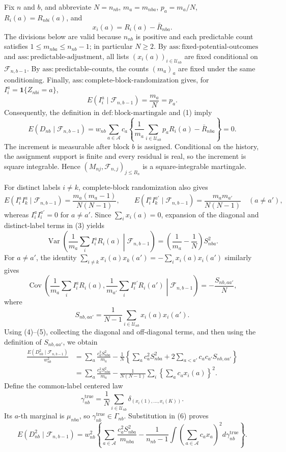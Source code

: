 Fix \(n\) and \(b\), and abbreviate \(N=n_{nb}\), \(m_a=m_{nba}\), \(p_a=m_a/N\), \(R_i(a)=R_{nbi}(a)\), and
\[
x_i(a)=R_i(a)-\bar R_{nba}.
\]
The divisions below are valid because \(n_{nb}\) is positive and each predictable count satisfies \(1\le m_{nba}\le n_{nb}-1\); in particular \(N\ge2\). By \(\mathrm{ass:fixed\text{-}potential\text{-}outcomes}\) and \(\mathrm{ass:predictable\text{-}adjustment}\), all lists \((x_i(a))_{i\in\mathcal U_{nb}}\) are fixed conditional on \(\mathcal F_{n,b-1}\). By \(\mathrm{ass:predictable\text{-}counts}\), the counts \((m_a)_a\) are fixed under the same conditioning. Finally, \(\mathrm{ass:complete\text{-}block\text{-}randomization}\) gives, for \(I_i^a=\mathbf 1\{Z_{nbi}=a\}\),
\[
E(I_i^a\mid\mathcal F_{n,b-1})=\frac{m_a}{N}=p_a.
\tag{1}
\]
Consequently, the definition in \(\mathrm{def:block\text{-}martingale}\) and (1) imply
\[
E(D_{nb}\mid\mathcal F_{n,b-1})
=w_{nb}\sum_{a\in\mathcal A}c_a
\left\{\frac1{m_a}\sum_{i\in\mathcal U_{nb}}p_aR_i(a)-\bar R_{nba}\right\}=0.
\tag{2}
\]
The increment is measurable after block \(b\) is assigned. Conditional on the history, the assignment support is finite and every residual is real, so the increment is square integrable. Hence \((M_{nj},\mathcal F_{n,j})_{j\le B_n}\) is a square-integrable martingale.

For distinct labels \(i\ne k\), complete-block randomization also gives
\[
E(I_i^aI_k^a\mid\mathcal F_{n,b-1})
=\frac{m_a(m_a-1)}{N(N-1)},
\qquad
E(I_i^aI_k^{a'}\mid\mathcal F_{n,b-1})
=\frac{m_am_{a'}}{N(N-1)}\quad(a\ne a'),
\tag{3}
\]
whereas \(I_i^aI_i^{a'}=0\) for \(a\ne a'\). Since \(\sum_i x_i(a)=0\), expansion of the diagonal and distinct-label terms in (3) yields
\[
\operatorname{Var}\!\left(\frac1{m_a}\sum_iI_i^aR_i(a)\middle|\mathcal F_{n,b-1}\right)
=\left(\frac1{m_a}-\frac1N\right)S_{nba}^2.
\tag{4}
\]
For \(a\ne a'\), the identity \(\sum_{i\ne k}x_i(a)x_k(a')=-\sum_i x_i(a)x_i(a')\) similarly gives
\[
\operatorname{Cov}\!\left(\frac1{m_a}\sum_iI_i^aR_i(a),
\frac1{m_{a'}}\sum_iI_i^{a'}R_i(a')\middle|\mathcal F_{n,b-1}\right)
=-\frac{S_{nb,aa'}}N,
\tag{5}
\]
where
\[
S_{nb,aa'}=\frac1{N-1}\sum_{i\in\mathcal U_{nb}}x_i(a)x_i(a').
\]
Using (4)--(5), collecting the diagonal and off-diagonal terms, and then using the definition of \(S_{nb,aa'}\), we obtain
\[
\begin{aligned}
\frac{E(D_{nb}^2\mid\mathcal F_{n,b-1})}{w_{nb}^2}
&=\sum_a\frac{c_a^2S_{nba}^2}{m_a}
-\frac1N\left\{\sum_a c_a^2S_{nba}^2+2\sum_{a<a'}c_ac_{a'}S_{nb,aa'}\right\}\\
&=\sum_a\frac{c_a^2S_{nba}^2}{m_a}
-\frac1{N(N-1)}\sum_i\left\{\sum_a c_ax_i(a)\right\}^2.
\end{aligned}
\tag{6}
\]
Define the common-label centered law
\[
\gamma_{nb}^{\mathrm{true}}
=\frac1N\sum_{i\in\mathcal U_{nb}}\delta_{(x_i(1),\ldots,x_i(K))}.
\]
Its \(a\)-th marginal is \(\mu_{nba}\), so \(\gamma_{nb}^{\mathrm{true}}\in\Gamma_{nb}\). Substitution in (6) proves
\[
E(D_{nb}^2\mid\mathcal F_{n,b-1})
=w_{nb}^2\left\{\sum_{a\in\mathcal A}\frac{c_a^2S_{nba}^2}{m_{nba}}
-\frac1{n_{nb}-1}\int\left(\sum_{a\in\mathcal A}c_ax_a\right)^2d\gamma_{nb}^{\mathrm{true}}\right\}.
\tag{7}
\]

